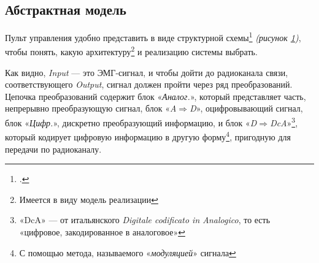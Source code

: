 \documentclass[a4paper, 10pt, final]{article} %
\newcommand{\InvisibleBorder}{
    (current bounding box.south west) ++($(-\fboxsep, -\fboxsep)-(0.5,0.5)$) coordinate (ll)
    (current bounding box.north east) ++($(\fboxsep, \fboxsep)+(0.5,0.5)$) coordinate (ur)
}
\begin{document}
    \subsection{Абстрактная модель}\label{sec:ProjectDesignAbstractModel}
    Пульт управления удобно представить в виде структурной схемы\footcite[]{BlockDiagram:Wiki} \emph{(рисунок \ref{fig:BlockDiagram})}, чтобы понять, какую архитектуру\footnote{Имеется в виду модель реализации} и реализацию системы выбрать.
    \begin{figure}[H]
        \centering
        \caption{}
        \label{fig:BlockDiagram}
    \end{figure}
    Как видно, \emph{Input} --- это ЭМГ-сигнал, и чтобы дойти до радиоканала связи, соответствующего \emph{Output}, сигнал должен пройти через ряд преобразований.
    Цепочка преобразований содержит блок «\emph{Аналог.}», который представляет часть, непрерывно преобразующую сигнал, блок «\emph{A$\Rightarrow$D}», оцифровывающий сигнал, блок «\emph{Цифр.}», дискретно преобразующий информацию, и блок «\emph{D$\Rightarrow$DcA}»\footnote{«DcA» --- от итальянского \emph{Digitale codificato in Analogico}, то есть «цифровое, закодированное в аналоговое»}, который кодирует цифровую информацию в другую форму\footnote{С помощью метода, называемого «\emph{модуляцией}» \parencite[]{Modulation:Wiki} сигнала}, пригодную для передачи по радиоканалу.
\end{document}
